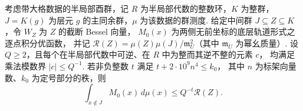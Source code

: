 \begin{lemma}[主同余群外的有限位壳层衰减]
\label{lem:b-local-shell}
\emitthmsource
考虑带大格数据的半局部酉群，记 $R$ 为半局部代数的整数环，$K$ 为整群，
$J=K(g)$ 为层元 $g$ 的主同余群，$\mu$ 为该数据的群测度.
给定中间群 $J\subseteq Z\subseteq K$，令 $W_Z$ 为 $Z$ 的截断 Bessel 向量，
$M_0(x)$ 为两侧无前坐标的底层轨道形式之逐点积分优函数，
并记 $\mathcal R(Z)=\mu(Z)\mu(J)/\mathfrak m_U^2$（其中 $\mathfrak m_U$ 为幂幺质量）.
设 $Q\ge2$，且每个在半局部代数中可逆、在 $R$ 中为整而其逆不整的元素 $c$，
均满足乘法模数界 $|c|\le Q^{-1}$.
若非负整数 $t$ 满足 $t+2\cdot10^9 n^4\le k_0$，
其中 $n$ 为标架向量数、$k_0$ 为定号部分的秩，则
\[
 \int_{x\notin J} M_0(x)\,d\mu(x)\le Q^{-t}\mathcal R(Z).
\]
\end{lemma}
